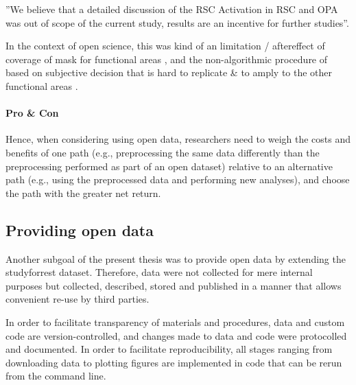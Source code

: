 %
''We believe that a detailed discussion of the RSC Activation in RSC and OPA was
out of scope of the current study, results are an incentive for further
studies''.


%
In the context of open science, this was kind of an limitation / aftereffect of
coverage of mask for functional areas \citet{sengupta2016extension}, and the
non-algorithmic procedure of \citet{sengupta2016extension} based on subjective
decision that is hard to replicate \& to amply to the other functional areas
\citep[cf. algorithmic procedure in, e.g.,][]{julian2012algorithmic}.


\paragraph{Pro \& Con}

Hence, when considering using open data, researchers need to weigh the costs and
benefits of one path (e.g., preprocessing the same data differently than the
preprocessing performed as part of an open dataset) relative to an alternative
path (e.g., using the preprocessed data and performing new analyses), and choose
the path with the greater net return.





\pagebreak


\subsection{Providing open data}



%
Another subgoal of the present thesis was to provide open data by extending the
studyforrest dataset.
%
Therefore, data were not collected for mere internal purposes but collected,
described, stored and published in a manner that allows convenient re-use by
third parties.



In order to facilitate transparency of materials and procedures, data and custom
code are version-controlled, and changes made to data and code were protocolled
and documented.
%
In order to facilitate reproducibility, all stages ranging from downloading data
to plotting figures are implemented in code that can be rerun from the command
line.


